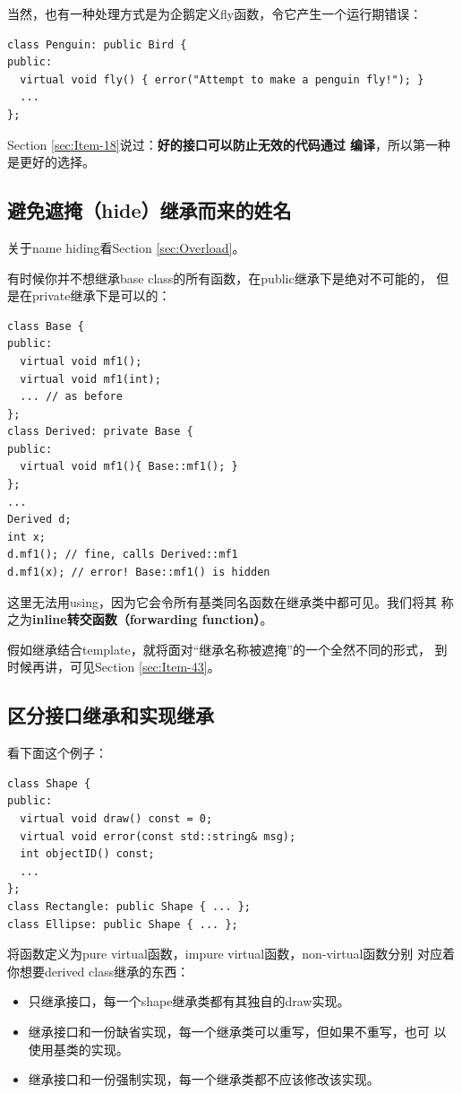\documentclass[a4paper,twoside]{article}
\theoremstyle{definition}
\theoremstyle{remark}
\numberwithin{equation}{section}
\begin{document}
当然，也有一种处理方式是为企鹅定义fly函数，令它产生一个运行期错误：
\begin{verbatim}
class Penguin: public Bird {
public:
  virtual void fly() { error("Attempt to make a penguin fly!"); }
  ...
};
\end{verbatim}

Section \ref{sec:Item-18}说过：\textbf{好的接口可以防止无效的代码通过
  编译}，所以第一种是更好的选择。

\subsection{避免遮掩（hide）继承而来的姓名}
\label{sec:Item-33}

关于name hiding看Section \ref{sec:Overload}。

有时候你并不想继承base class的所有函数，在public继承下是绝对不可能的，
但是在private继承下是可以的：
\begin{verbatim}
class Base {
public:
  virtual void mf1();
  virtual void mf1(int);
  ... // as before
};
class Derived: private Base {
public:
  virtual void mf1(){ Base::mf1(); } 
};
...
Derived d;
int x;
d.mf1(); // fine, calls Derived::mf1
d.mf1(x); // error! Base::mf1() is hidden
\end{verbatim}
这里无法用using，因为它会令所有基类同名函数在继承类中都可见。我们将其
称之为\textbf{inline转交函数（forwarding function）}。

假如继承结合template，就将面对“继承名称被遮掩”的一个全然不同的形式，
到时候再讲，可见Section \ref{sec:Item-43}。

\subsection{区分接口继承和实现继承}
\label{sec:Item-34}

看下面这个例子：
\begin{verbatim}
class Shape {
public:
  virtual void draw() const = 0;
  virtual void error(const std::string& msg);
  int objectID() const;
  ...
};
class Rectangle: public Shape { ... };
class Ellipse: public Shape { ... };
\end{verbatim}

将函数定义为pure virtual函数，impure virtual函数，non-virtual函数分别
对应着你想要derived class继承的东西：
\begin{itemize}
\item 只继承接口，每一个shape继承类都有其独自的draw实现。
\item 继承接口和一份缺省实现，每一个继承类可以重写，但如果不重写，也可
  以使用基类的实现。
\item 继承接口和一份强制实现，每一个继承类都不应该修改该实现。
\end{itemize}
\end{document}
